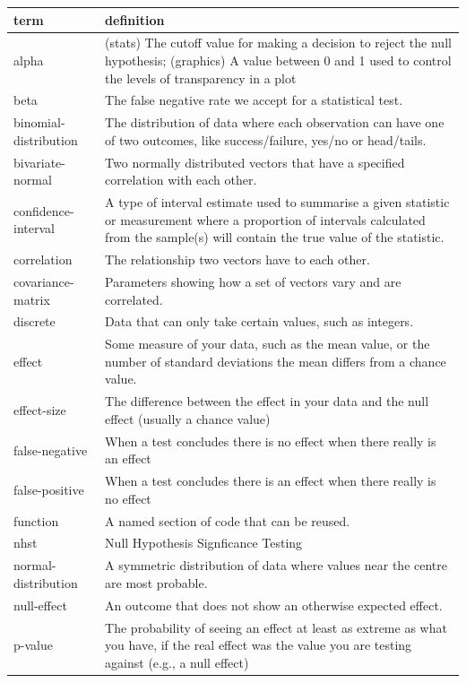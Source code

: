 \documentclass[
  oneside]{book}
\begin{document}
\begin{tabular}{l|l}
\hline
term & definition\\
\hline
alpha & (stats) The cutoff value for making a decision to reject the null hypothesis; (graphics) A value between 0 and 1 used to control the levels of transparency in a plot\\
\hline
beta & The false negative rate we accept for a statistical test.\\
\hline
binomial-distribution & The distribution of data where each observation can have one of two outcomes, like success/failure, yes/no or head/tails.\\
\hline
bivariate-normal & Two normally distributed vectors that have a specified correlation with each other.\\
\hline
confidence-interval & A type of interval estimate used to summarise a given statistic or measurement where a proportion of intervals calculated from the sample(s) will contain the true value of the statistic.\\
\hline
correlation & The relationship two vectors have to each other.\\
\hline
covariance-matrix & Parameters showing how a set of vectors vary and are correlated.\\
\hline
discrete & Data that can only take certain values, such as integers.\\
\hline
effect & Some measure of your data, such as the mean value, or the number of standard deviations the mean differs from a chance value.\\
\hline
effect-size & The difference between the effect in your data and the null effect (usually a chance value)\\
\hline
false-negative & When a test concludes there is no effect when there really is an effect\\
\hline
false-positive & When a test concludes there is an effect when there really is no effect\\
\hline
function & A named section of code that can be reused.\\
\hline
nhst & Null Hypothesis Signficance Testing\\
\hline
normal-distribution & A symmetric distribution of data where values near the centre are most probable.\\
\hline
null-effect & An outcome that does not show an otherwise expected effect.\\
\hline
p-value & The probability of seeing an effect at least as extreme as what you have, if the real effect was the value you are testing against (e.g., a null effect)\\

\end{tabular}
\end{document}
